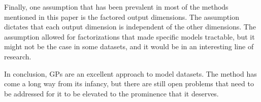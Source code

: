 \documentclass[letterpaper,11pt]{extarticle}
\begin{document}
Finally, one assumption that has been prevalent in most of the methods mentioned in this paper is the factored output dimensions.  The assumption dictates that each output dimension is independent of the other dimensions. The assumption allowed for factorizations that made specific models tractable, but it might not be the case in some datasets, and it would be in an interesting line of research. 

In conclusion, GPs are an excellent approach to model datasets. The method has come a long way from its infancy, but there are still open problems that need to be addressed for it to be elevated to the prominence that it deserves. 



\end{document}
